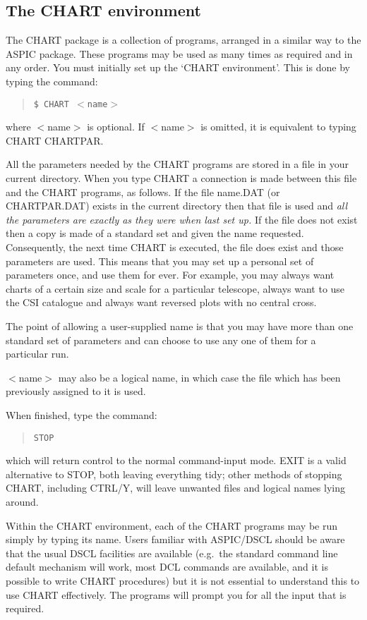 \subsection{The CHART environment}
\label{env}
The CHART package is a collection of programs, arranged in a similar way to the
ASPIC package.
These programs may be used as many times as required and in any order.
You must initially set up the `CHART environment'.
This is done by typing the command:
\begin{quote}
{\tt \$ CHART $<$name$>$}
\end{quote}
where $<$name$>$ is optional.
If $<$name$>$ is omitted, it is equivalent to typing  CHART CHARTPAR.

All the parameters needed by the CHART programs are stored in a file in your
current directory.
When you type CHART a connection is made between this file and the CHART
programs, as follows.
If the file name.DAT (or CHARTPAR.DAT) exists in the current directory then that
file is used and {\em all the parameters are exactly as they were when last 
set up.}
If the file does not exist then a copy is made of a standard set and given the
name requested.
Consequently, the next time CHART is executed, the file does exist and those
parameters are used.
This means that you may set up a personal set of parameters once, and use them
for ever.
For example, you may always want charts of a certain size and scale for a
particular telescope, always want to use the CSI catalogue and always want
reversed plots with no central cross.

The point of allowing a user-supplied name is that you may have more than one
standard set of parameters and can choose to use any one of them for a
particular run.

$<$name$>$ may also be a logical name, in which case the file which has been
previously assigned to it is used.

When finished, type the command:
\begin{quote}
{\tt STOP}
\end{quote}
which will return control to the normal command-input mode.
EXIT is a valid alternative to STOP, both leaving everything tidy; other methods
of stopping CHART, including CTRL/Y, will leave unwanted files and logical
names lying around.

Within the CHART environment, each of the CHART programs may be run simply by
typing its name.
Users familiar with ASPIC/DSCL should be aware that the usual DSCL facilities
are available (e.g.\ the standard command line default mechanism will work, most
DCL commands are available, and it is possible to write CHART procedures) but it
is not essential to understand this to use CHART effectively.
The programs will prompt you for all the input that is required.

